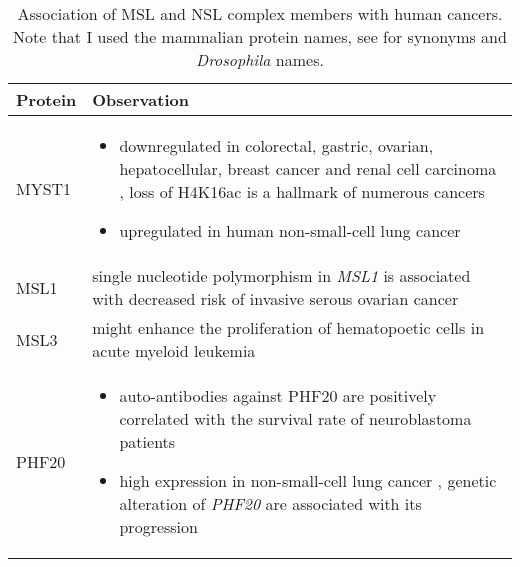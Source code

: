 \vspace*{-4em}
\begin{minipage}{\textwidth} %
\begin{singlespacing}
\begin{small}
\setlength{\extrarowheight}{2pt}
\begin{longtable}[l]{>{\textsf\bgroup}p{2cm}<{\egroup} >{\textsf\bgroup}p{12.5cm}<{\egroup}} %
\caption[Association of MSL and NSL complex members with human cancers.]{\textsf{Association of MSL and NSL complex members with human cancers. Note that I used the mammalian protein names, see  for synonyms and \textit{Drosophila} names.}} \\ %
\textbf{Protein} & \textbf{Observation}
\tabularnewline
\toprule
 MYST1 & \begin{minipage}{12.5cm}
				\begin{itemize}[noitemsep,leftmargin=*]
					\item downregulated in colorectal, gastric, ovarian, hepatocellular, breast cancer and renal cell carcinoma \citep{Pfister2008,Giampieri2013,Liu2013,Wang2013,Cao2014,Zhang2014a}, loss of H4K16ac is a hallmark of numerous cancers \citep{Fraga2005}
					\item upregulated in human non-small-cell lung cancer \citep{Chen2014}
					\end{itemize}
				\end{minipage}
\tabularnewline \midrule
MSL1 & single nucleotide polymorphism in \textit{MSL1} is associated with decreased risk of invasive serous ovarian cancer \citep{Peedicayil2010} 
\tabularnewline \midrule
MSL3 & might enhance the proliferation of hematopoetic cells in acute myeloid leukemia \citep{Sinenko2010}
\tabularnewline \midrule
PHF20 & \begin{minipage}{12.5cm}
\begin{itemize}[noitemsep, leftmargin=*]
\item auto-antibodies against PHF20 are positively correlated with the survival rate of neuroblastoma patients \citep{Fischer2001,Pallasch2005}
\item high expression in non-small-cell lung cancer \citep{Taniwaki2006}, genetic alteration of \textit{PHF20} are associated with its progression \citep{Bankovic2010}

\end{itemize}
\end{minipage}
\end{longtable}
\end{small}
\end{singlespacing}
\end{minipage}
